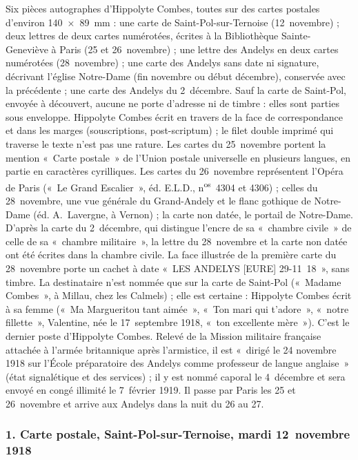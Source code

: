 Six pièces autographes d'Hippolyte Combes, toutes sur des cartes postales d'environ 140~×~89~mm : une carte de Saint-Pol-sur-Ternoise (12~novembre) ; deux lettres de deux cartes numérotées, écrites à la Bibliothèque Sainte-Geneviève à Paris (25 et 26~novembre) ; une lettre des Andelys en deux cartes numérotées (28~novembre) ; une carte des Andelys sans date ni signature, décrivant l'église Notre-Dame (fin novembre ou début décembre), conservée avec la précédente ; une carte des Andelys du 2~décembre. Sauf la carte de Saint-Pol, envoyée à découvert, aucune ne porte d'adresse ni de timbre : elles sont parties sous enveloppe. Hippolyte Combes écrit en travers de la face de correspondance et dans les marges (souscriptions, post-scriptum) ; le filet double imprimé qui traverse le texte n'est pas une rature. Les cartes du 25~novembre portent la mention «~Carte postale~» de l'Union postale universelle en plusieurs langues, en partie en caractères cyrilliques. Les cartes du 26~novembre représentent l'Opéra de Paris («~Le Grand Escalier~», éd. E.L.D., n\textsuperscript{os}~4304 et 4306) ; celles du 28~novembre, une vue générale du Grand-Andely et le flanc gothique de Notre-Dame (éd. A.~Lavergne, à Vernon) ; la carte non datée, le portail de Notre-Dame. D'après la carte du 2~décembre, qui distingue l'encre de sa «~chambre civile~» de celle de sa «~chambre militaire~», la lettre du 28~novembre et la carte non datée ont été écrites dans la chambre civile. La face illustrée de la première carte du 28~novembre porte un cachet à date «~LES ANDELYS [EURE] 29-11~18~», sans timbre. La destinataire n'est nommée que sur la carte de Saint-Pol («~Madame Combes~», à Millau, chez les Calmels) ; elle est certaine : Hippolyte Combes écrit à sa femme («~Ma Margueritou tant aimée~», «~Ton mari qui t'adore~», «~notre fillette~», Valentine, née le 17~septembre 1918, «~ton excellente mère~»). C'est le dernier poste d'Hippolyte Combes. Relevé de la Mission militaire française attachée à l'armée britannique après l'armistice, il est «~dirigé le 24 novembre 1918 sur l'École préparatoire des Andelys comme professeur de langue anglaise~» (état signalétique et des services) ; il y est nommé caporal le 4~décembre et sera envoyé en congé illimité le 7~février 1919. Il passe par Paris les 25 et 26~novembre et arrive aux Andelys dans la nuit du 26 au 27.

\subsubsection*{1. Carte postale, Saint-Pol-sur-Ternoise, mardi 12~novembre 1918}

